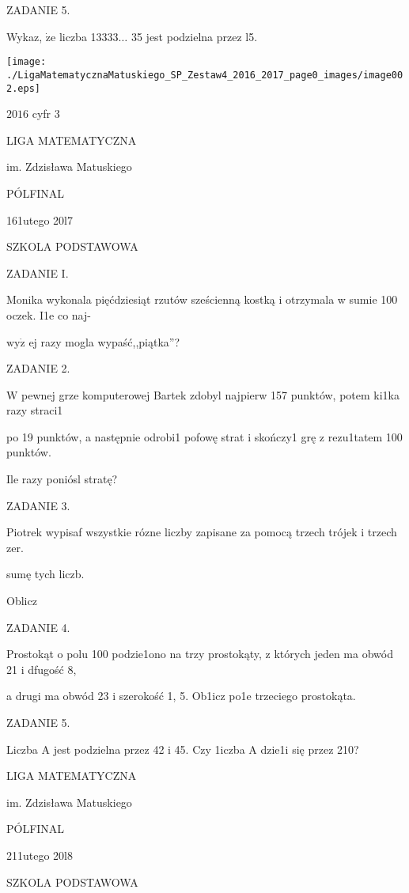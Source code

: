 \documentclass[a4paper,12pt]{article}
\begin{document}
ZADANIE 5.

Wykaz, $\dot{\mathrm{z}}\mathrm{e}$ liczba 13333$\ldots$ 35 jest podzielna przez l5.
\begin{center}
\texttt{[image: ./LigaMatematycznaMatuskiego\_SP\_Zestaw4\_2016\_2017\_page0\_images/image002.eps]}
\end{center}
$2016$ cyfr 3






LIGA MATEMATYCZNA

im. Zdzisława Matuskiego

PÓLFINAL

161utego 20l7

SZKOLA PODSTAWOWA

ZADANIE I.

Monika wykonala pięćdziesiąt rzutów sześcienną kostką i otrzymala w sumie 100 oczek. I1e co naj-

$\mathrm{w}\mathrm{y}\dot{\mathrm{z}}$ ej razy mogla wypaść,,piątka''?

ZADANIE 2.

$\mathrm{W}$ pewnej grze komputerowej Bartek zdobyl najpierw 157 punktów, potem ki1ka razy straci1

po 19 punktów, a następnie odrobi1 pofowę strat i skończy1 grę z rezu1tatem 100 punktów.

Ile razy poniósl stratę?

ZADANIE 3.

Piotrek wypisaf wszystkie rózne liczby zapisane za pomocą trzech trójek i trzech zer.

sumę tych liczb.

Oblicz

ZADANIE 4.

Prostokąt o polu 100 podzie1ono na trzy prostokąty, z których jeden ma obwód 21 i dfugość 8,

a drugi ma obwód 23 i szerokość 1, 5. Ob1icz po1e trzeciego prostokąta.

ZADANIE 5.

Liczba A jest podzielna przez 42 i 45. Czy 1iczba A dzie1i się przez 210?






LIGA MATEMATYCZNA

im. Zdzisława Matuskiego

PÓLFINAL

211utego 20l8

SZKOLA PODSTAWOWA
\end{document}

